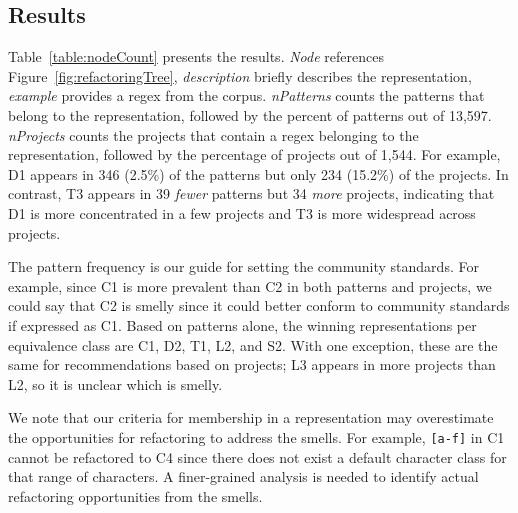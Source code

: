 \subsection{Results}
Table~\ref{table:nodeCount} presents the results. 
 \emph{Node}  references  Figure~\ref{fig:refactoringTree}, \emph{description}  briefly describes the representation, \emph{example} provides a regex from the corpus.  \emph{nPatterns}  counts the patterns that belong to the representation, followed by the percent of patterns out of 13,597.
 \emph{nProjects}  counts the projects that contain a regex belonging to the representation,
followed by the percentage of projects out of 1,544.
For example, D1 appears in 346 (2.5\%) of the patterns but only 234 (15.2\%) of the projects.
  In contrast,  T3 appears in 39 \emph{fewer} patterns but 34 \emph{more} projects, indicating that D1 is more concentrated in a few projects and T3 is more widespread across projects.

The pattern frequency is our guide for setting the community standards. 
For example, since C1 is more prevalent than C2 in both patterns and projects, we could say that C2 is smelly since it could better conform to community standards if expressed as C1. 
Based on patterns alone, the winning representations per equivalence class are C1, D2, T1, L2, and S2. With one exception, these are the same for recommendations based on projects; L3 appears in more projects than L2, so it is unclear which is smelly. 

We note that our criteria for membership in a representation may overestimate the opportunities for refactoring to address the smells. For example, \verb![a-f]! in C1 cannot be refactored to C4 since there does not exist a default character class for that range of characters. A finer-grained analysis is needed to identify actual refactoring opportunities from the smells. 

